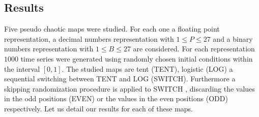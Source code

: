 %
\subsection{Results}\label{sec:resultados}
Five pseudo chaotic maps were studied. For each one a floating point representation, a decimal numbers representation with $1\leq P \leq 27$ and a binary numbers representation with $1\leq B \leq 27$ are considered. For each representation $1000$ time series were generated using randomly chosen initial conditions within the interval $[0,1]$. 
The studied maps are tent (TENT), logistic (LOG) a sequential switching between TENT and LOG (SWITCH). Furthermore a skipping randomization procedure is applied to SWITCH \cite{DeMicco2008}, discarding the values in the odd positions (EVEN) or the values in the even positions (ODD) respectively. Let us detail our results for each of these maps. 
